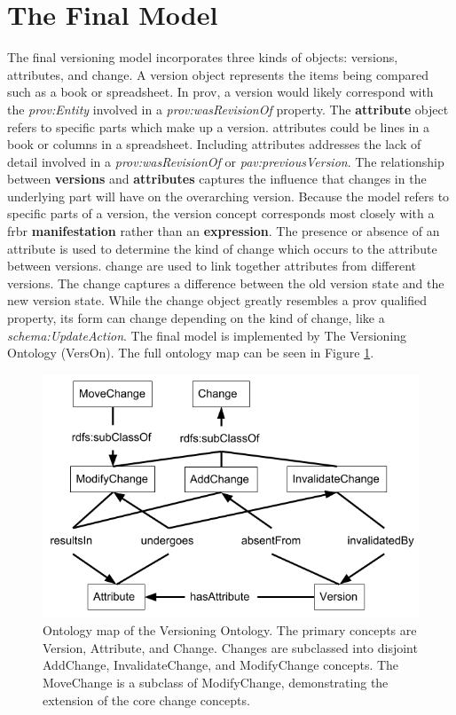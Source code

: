 \section{The Final Model} \label{sec:model}

The final versioning model incorporates three kinds of objects: \glspl{version}, \glspl{attribute}, and \gls{change}.
A \gls{version} object represents the items being compared such as a book or spreadsheet.
In \gls{prov}, a \gls{version} would likely correspond with the \textit{prov:Entity} involved in a \textit{prov:wasRevisionOf} property.
The \textbf{attribute} object refers to specific parts which make up a \gls{version}.
\Glspl{attribute} could be lines in a book or columns in a spreadsheet.
Including \glspl{attribute} addresses the lack of detail involved in a \textit{prov:wasRevisionOf} or \textit{pav:previousVersion}.
The relationship between \textbf{versions} and \textbf{attributes} captures the influence that changes in the underlying part will have on the overarching \gls{version}.
Because the model refers to specific parts of a \gls{version}, the \gls{version} concept corresponds most closely with a \gls{frbr} \textbf{manifestation} rather than an \textbf{expression}.
The presence or absence of an \gls{attribute} is used to determine the kind of \gls{change} which occurs to the \gls{attribute} between \glspl{version}.
\Gls{change} are used to link together \glspl{attribute} from different \glspl{version}.
The \gls{change} captures a difference between the old \gls{version} state and the new \gls{version} state.
While the \gls{change} object greatly resembles a \gls{prov} qualified property, its form can change depending on the kind of \gls{change}, like a \textit{schema:UpdateAction}.
The final model is implemented by The Versioning Ontology (VersOn).
The full ontology map can be seen in Figure \ref{vo_map}.
\begin{figure}
	\centering
	\includegraphics[scale=.9]{figures/OntologyMap.png}
	\caption{Ontology map of the Versioning Ontology.  The primary concepts are Version, Attribute, and Change.  Changes are subclassed into disjoint AddChange, InvalidateChange, and ModifyChange concepts.  The MoveChange is a subclass of ModifyChange, demonstrating the extension of the core change concepts.}
	\label{vo_map}
\end{figure}

